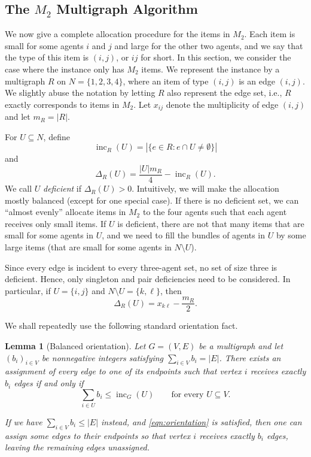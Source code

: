 \documentclass{article}
\newtheorem{lemma}{Lemma}
\theoremstyle{definition}
\begin{document}
\subsection{The $M_2$ Multigraph Algorithm}
\label{subsec:2}
We now give a complete allocation procedure for the items in $M_2$.
Each item is small for some agents $i$ and $j$ and
large for the other two agents, and we say that the type of this item is $(i,j)$, or $ij$ for short.
In this section, we consider the case where the instance only has $M_{2}$ items.
We represent the instance by a
multigraph $R$ on $N=\{1,2,3,4\}$, where an item of type $(i,j)$ is an edge $(i,j)$.
We slightly abuse the notation by letting $R$ also represent the edge set, i.e., $R$ exactly corresponds to items in $M_2$.
Let $x_{ij}$ denote the multiplicity of edge $(i,j)$ and let $m_R=|R|$.

For $U\subseteq N$, define
\[
 \operatorname{inc}_R(U)=\left|\{e\in R:e\cap U\neq\emptyset\}\right|
\]
and
\[
 \Delta_R(U)=\frac{|U|m_R}{4}-\operatorname{inc}_R(U).
\]
We call $U$ \emph{deficient} if $\Delta_R(U)>0$.  
Intuitively, we will make the allocation mostly balanced (except for one special case).
If there is no deficient set, we can ``almost evenly'' allocate items in $M_2$ to the four agents such that each agent receives only small items.
If $U$ is deficient, there are not that many items that are small for some agents in $U$, and we need to fill the bundles of agents in $U$ by some large items (that are small for some agents in $N\setminus U$). 

Since every edge is
incident to every three-agent set, no set of size three is deficient.  Hence,
only singleton and pair deficiencies need to be considered.  In particular,
if $U=\{i,j\}$ and $N\setminus U=\{k,\ell\}$, then
\[
 \Delta_R(U)=x_{k\ell}-\frac{m_R}{2}.
\]

We shall repeatedly use the following standard orientation fact.

\begin{lemma}[Balanced orientation]\label{lem:balancedorientation}
Let $G=(V,E)$ be a multigraph and let $(b_i)_{i\in V}$ be nonnegative
integers satisfying $\sum_{i\in V}b_i=|E|$.  There exists an assignment of
every edge to one of its endpoints such that vertex $i$ receives exactly
$b_i$ edges if and only if
\begin{equation}\label{eqn:orientation}
    \sum_{i\in U}b_i\le \operatorname{inc}_G(U)
 \qquad\text{for every }U\subseteq V.
\end{equation}

If we have \(\sum_{i\in V}b_i\le |E|\) instead, and \eqref{eqn:orientation} is satisfied, then one can assign some edges to their endpoints so that vertex \(i\)
receives exactly \(b_i\) edges, leaving the remaining edges unassigned.
\end{lemma}
\end{document}
